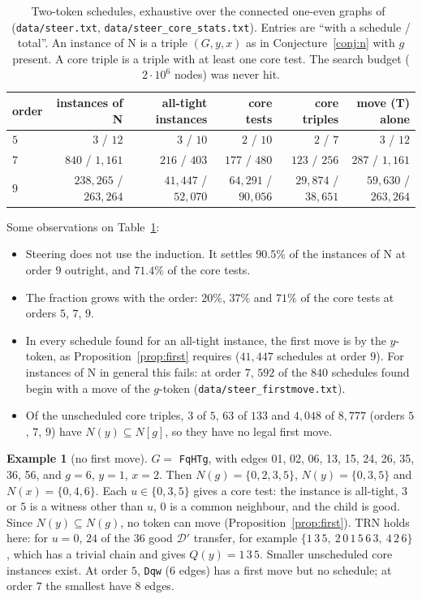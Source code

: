 \documentclass[11pt]{amsart}
\theoremstyle{definition}
\newtheorem{example}[theorem]{Example}
\newcommand{\cD}{\mathcal D}
\newcommand{\TRN}{\mathrm{TRN}}
\begin{document}
\begin{table}[ht]
\caption{Two-token schedules, exhaustive over the connected one-even graphs of~\cite{STL}
(\texttt{data/steer.txt}, \texttt{data/steer\_core\_stats.txt}). Entries are ``with a schedule /
total''. An instance of N is a triple $(G,y,x)$ as in Conjecture~\ref{conj:n} with $g$ present. A
core triple is a triple with at least one core test. The search budget ($2\cdot10^6$ nodes) was
never hit.}\label{tab:steer}
\small
\begin{tabular}{@{}lrrrrr@{}}
\toprule
order & instances of N & all-tight instances & core tests & core triples & move (T) alone\\
\midrule
$5$ & $3$ / $12$ & $3$ / $10$ & $2$ / $10$ & $2$ / $7$ & $3$ / $12$\\
$7$ & $840$ / $1{,}161$ & $216$ / $403$ & $177$ / $480$ & $123$ / $256$ & $287$ / $1{,}161$\\
$9$ & $238{,}265$ / $263{,}264$ & $41{,}447$ / $52{,}070$ & $64{,}291$ / $90{,}056$ & $29{,}874$ /
$38{,}651$ & $59{,}630$ / $263{,}264$\\
\bottomrule
\end{tabular}
\end{table}

Some observations on Table~\ref{tab:steer}:
\begin{itemize}
\item Steering does not use the induction. It settles $90.5\%$ of the instances of N at order $9$
outright, and $71.4\%$ of the core tests.
\item The fraction grows with the order: $20\%$, $37\%$ and $71\%$ of the core tests at orders $5$,
$7$, $9$.
\item In every schedule found for an all-tight instance, the first move is by the $y$-token, as
Proposition~\ref{prop:first} requires ($41{,}447$ schedules at order $9$). For instances of N in
general this fails: at order $7$, $592$ of the $840$ schedules found begin with a move of the
$g$-token (\texttt{data/steer\_firstmove.txt}).
\item Of the unscheduled core triples, $3$ of $5$, $63$ of $133$ and $4{,}048$ of $8{,}777$ (orders
$5$, $7$, $9$) have $N(y)\subseteq N[g]$, so they have no legal first move.
\end{itemize}

\begin{example}[no first move]\label{ex:FqHTg}
$G=$ \texttt{FqHTg}, with edges 01, 02, 06, 13, 15, 24, 26, 35, 36, 56, and $g=6$, $y=1$, $x=2$. Then
$N(g)=\{0,2,3,5\}$, $N(y)=\{0,3,5\}$ and $N(x)=\{0,4,6\}$. Each $u\in\{0,3,5\}$ gives a core test:
the instance is all-tight, $3$ or $5$ is a witness other than $u$, $0$ is a common neighbour, and
the child is good. Since $N(y)\subseteq N(g)$, no token can move (Proposition~\ref{prop:first}).
$\TRN$ holds here: for $u=0$, $24$ of the $36$ good $\cD'$ transfer, for example
$\{1\,3\,5,\ 2\,0\,1\,5\,6\,3,\ 4\,2\,6\}$, which has a trivial chain and gives $Q(y)=1\,3\,5$.
Smaller unscheduled core instances exist. At order $5$, \texttt{Dqw} ($6$ edges) has a first move but
no schedule; at order $7$ the smallest have $8$ edges.
\end{example}
\end{document}
